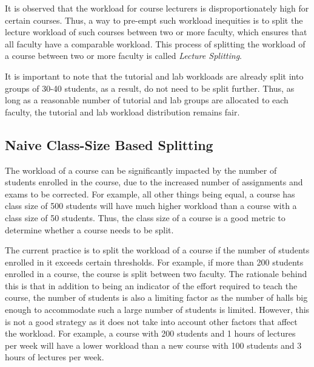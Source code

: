 It is observed that the workload for course lecturers is disproportionately high for certain courses. Thus, a way to pre-empt such workload inequities is to split the lecture workload of such courses between two or more faculty, which ensures that all faculty have a comparable workload. This process of splitting the workload of a course between two or more faculty is called \textit{Lecture Splitting}.

It is important to note that the tutorial and lab workloads are already split into groups of 30-40 students, as a result, do not need to be split further. Thus, as long as a reasonable number of tutorial and lab groups are allocated to each faculty, the tutorial and lab workload distribution remains fair.



\subsection{Naive Class-Size Based Splitting}

The workload of a course can be significantly impacted by the number of students enrolled in the course, due to the increased number of assignments and exams to be corrected. For example, all other things being equal, a course has class size of 500 students will have much higher workload than a course with a class size of 50 students. Thus, the class size of a course is a good metric to determine whether a course needs to be split.

The current practice is to split the workload of a course if the number of students enrolled in it exceeds certain thresholds. For example, if more than 200 students enrolled in a course, the course is split between two faculty. The rationale behind this is that in addition to being an indicator of the effort required to teach the course, the number of students is also a limiting factor as the number of halls big enough to accommodate such a large number of students is limited. However, this is not a good strategy as it does not take into account other factors that affect the workload. For example, a course with 200 students and 1 hours of lectures per week will have a lower workload than a new course with 100 students and 3 hours of lectures per week.

